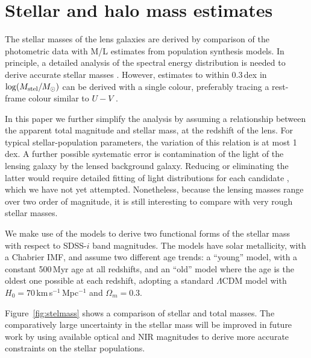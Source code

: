 \section{Stellar and halo mass estimates}\label{sec:stellar-mass}

The stellar masses of the lens galaxies are derived by comparison of
the photometric data with M/L estimates from population synthesis
models.  In principle, a detailed analysis of the spectral energy
distribution is needed to derive accurate stellar masses
\citep[e.g.][]{2009ApJS..185..253G,2011MNRAS.418.1587T}.  However,
estimates to within 0.3\,dex in $\log(M_\text{stel}/M_\odot)$ can be derived
with a single colour, preferably tracing a rest-frame colour similar
to $U-V$ \citep[see Fig.~1 of][]{2008MNRAS.383..857F}. 

In this paper we further simplify the analysis by assuming a
relationship between the apparent total magnitude and stellar mass, at
the redshift of the lens.  For typical stellar-population parameters,
the variation of this relation is at most 1\,dex.  A further possible
systematic error is contamination of the light of the lensing galaxy
by the lensed background galaxy.  Reducing or eliminating the latter
would require detailed fitting of light distributions for each
candidate \citep[see][]{2011ApJ...740...97L}, which we have not yet
attempted.  Nonetheless, because the lensing masses range over two
order of magnitude, it is still interesting to compare with very rough
stellar masses.

We make use of the \citet{2003MNRAS.344.1000B} models to derive two
functional forms of the stellar mass with respect to SDSS-$i$ band
magnitudes. The models have solar metallicity, with a Chabrier IMF,
and assume two different age trends: a ``young'' model, with a
constant 500\,Myr age at all redshifts, and an ``old'' model where the
age is the oldest one possible at each redshift, adopting a standard
$\Lambda$CDM model with $H_0=70$\,km\,s$^{-1}$\,Mpc$^{-1}$ and
$\Omega_m=0.3$.

Figure~\ref{fig:stelmass} shows a comparison of stellar and total
masses.  The comparatively large uncertainty in the stellar mass will
be improved in future work by using available optical and NIR
magnitudes to derive more accurate constraints on the stellar
populations.

